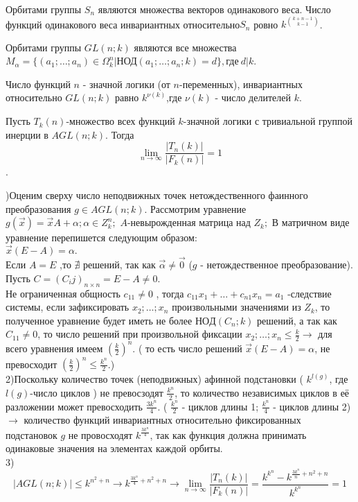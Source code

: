 Орбитами группы $S_n$ являются множества векторов одинакового веса. Число функций одинакового веса инвариантных относительно$ S_n$ ровно $k^{k+n-1 \choose k-1}$.

\thr Орбитами группы $GL(n;k)$ являются все множества $M_\alpha=\{(a_1;\dots;a_n)\in \Omega_k^n|\mathrm{\text{НОД}}(a_1;\dots;a_n;k)=d\}, \text{где}\   d|k$.
                   
\conseq Число функций $n$ - значной логики (от $n$-переменных), инвариантных относительно $GL(n;k)$ равно $k^{\nu(k)}$,где $\nu(k)$ - число делителей $k$.

\thr
Пусть $T_k(n)$-множество всех функций $k$-значной логики с тривиальной группой инерции в $AGL(n;k)$. Тогда $$\lim_{n\to\infty} \frac{|T_n(k)|}{|F_k(n)|}=1$$.

)Оценим сверху число неподвижных точек нетождественного фаинного преобразования $g \in AGL(n;k)$.  Рассмотрим уравнение $g(\vec{x})=\vec{x}A+\alpha;\alpha \in Z_k^n;$ $A$-невырожденная матрица над $Z_k;$ В матричном виде уравнение перепишется следующим образом:\\
$\vec{x}(E-A)=\alpha. $\\
Если $A=E$ ,то $\nexists$ решений, так как $\vec{\alpha}\neq \vec{0}$ ($g$ - нетождественное преобразование). Пусть $ C=(C_ij)_{n \times n} = E-A \neq 0 $.\\

Не ограниченная общность $c_{11} \neq 0 $ , тогда $ c_{11} x_1 + \ldots + c_{n1} x_n = a_1 $ -следствие системы, если зафиксировать $x_2;\dots;x_n $ произвольными значениями из $Z_k $, то полученное уравнение будет иметь не более $НОД(C_n;k) $ решений, а так как $C_{11} \neq 0$, то число решений при произвольной фиксации $x_2;\dots;x_n \leqslant \frac{k}{2} \rightarrow $ для всего уравнения имеем $ (\frac {k}{2})^n$. ( то есть число решений $\vec{x}(E-A) = \alpha $, не превосходит $(\frac {k}{2})^n \leqslant \frac {k^n}{2} $.)\\
2)Поскольку количество точек (неподвижных) афинной подстановки ( $ k^{l(g)} $, где $l(g)$-число циклов ) не превосзодят $\frac {k^n}{2} $, то количество независимых циклов в её разложении может превосходить $\frac {3k^n}{4} $. ( $\frac {k^n}{2} $ - циклов длины 1; $\frac {k^n}{4} $ - циклов длины 2)\\
$\rightarrow $ количество функций инвариантных относительно фиксированных подстановок $g$ не провосходят $k^{\frac{3k^n}{4}}$, так как функция должна принимать одинаковые значения на элементах каждой орбиты. \\
3) $$|AGL(n;k)| \leqslant k^{n^2+n} \rightarrow k^{\frac{3k^n}{4} +n^2 +n} \rightarrow \lim_{n\to\infty} \frac{|T_n(k)|}{|F_k(n)|} = \frac {k^{k^n}-k^{\frac {3k^n}{n}+n^2+n}}{k^{k^n}}=1$$\\

